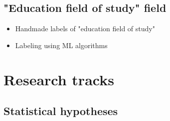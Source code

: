 \documentclass[12pt]{article}
\theoremstyle{plain}
\theoremstyle{definition}
\begin{document}
\subsection{"Education field of study" field}

\begin{itemize}
    \item Handmade labels of "education field of study"
    \item Labeling using ML algorithms
   
\end{itemize}

\pagebreak

\section{Research tracks}

\subsection{Statistical hypotheses}
\end{document}
